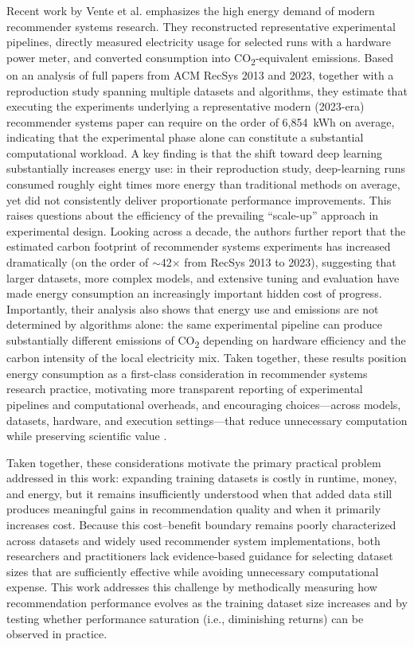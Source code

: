 \documentclass[12pt,a4paper]{article}
\begin{document}
Recent work by Vente et al. emphasizes the high energy demand of modern recommender systems research. They reconstructed representative experimental pipelines, directly measured electricity usage for selected runs with a hardware power meter, and converted consumption into CO\textsubscript{2}-equivalent emissions. Based on an analysis of full papers from ACM RecSys 2013 and 2023, together with a reproduction study spanning multiple datasets and algorithms, they estimate that executing the experiments underlying a representative modern (2023-era) recommender systems paper can require on the order of 6{,}854~kWh on average, indicating that the experimental phase alone can constitute a substantial computational workload. A key finding is that the shift toward deep learning substantially increases energy use: in their reproduction study, deep-learning runs consumed roughly eight times more energy than traditional methods on average, yet did not consistently deliver proportionate performance improvements. This raises questions about the efficiency of the prevailing “scale-up” approach in experimental design. Looking across a decade, the authors further report that the estimated carbon footprint of recommender systems experiments has increased dramatically (on the order of $\sim$42$\times$ from RecSys 2013 to 2023), suggesting that larger datasets, more complex models, and extensive tuning and evaluation have made energy consumption an increasingly important hidden cost of progress. Importantly, their analysis also shows that energy use and emissions are not determined by algorithms alone: the same experimental pipeline can produce substantially different emissions of CO\textsubscript{2} depending on hardware efficiency and the carbon intensity of the local electricity mix. Taken together, these results position energy consumption as a first-class consideration in recommender systems research practice, motivating more transparent reporting of experimental pipelines and computational overheads, and encouraging choices---across models, datasets, hardware, and execution settings---that reduce unnecessary computation while preserving scientific value \cite{vente2024}.

Taken together, these considerations motivate the primary practical problem addressed in this work: expanding training datasets is costly in runtime, money, and energy, but it remains insufficiently understood when that added data still produces meaningful gains in recommendation quality and when it primarily increases cost. Because this cost--benefit boundary remains poorly characterized across datasets and widely used recommender system implementations, both researchers and practitioners lack evidence-based guidance for selecting dataset sizes that are sufficiently effective while avoiding unnecessary computational expense. This work addresses this challenge by methodically measuring how recommendation performance evolves as the training dataset size increases and by testing whether performance saturation (i.e., diminishing returns) can be observed in practice.
\end{document}
